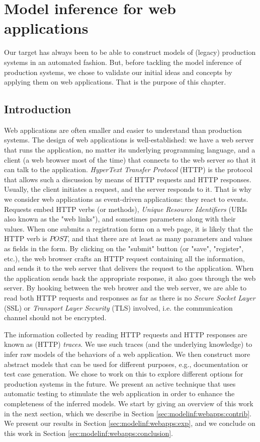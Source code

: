 %
\chapter{Model inference for web applications}
\label{sec:modelinf:webapps}

Our target has always been to be able to construct models of
(legacy) production systems in an automated fashion. But, before
tackling the model inference of production systems, we chose to
validate our initial ideas and concepts by applying them on web
applications. That is the purpose of this chapter.

\section{Introduction}

Web applications are often smaller and easier to understand than
production systems. The design of web applications is
well-established: we have a web server that runs the application,
no matter its underlying programming language, and a client (a
web browser most of the time) that connects to the web server so
that it can talk to the application. \textit{HyperText Transfer
Protocol} (HTTP) is the protocol that allows such a discussion by
means of HTTP requests and HTTP responses. Usually, the client
initiates a request, and the server responds to it. That is why
we consider web applications as event-driven applications: they
react to events. Requests embed HTTP verbs (or methods),
\textit{Unique Resource Identifiers} (URIs also known as the "web
links"), and sometimes parameters along with their values. When
one submits a registration form on a web page, it is likely that
the HTTP verb is $POST$, and that there are at least as many
parameters and values as fields in the form. By clicking on the
"submit" button (or "save", "register", etc.), the web browser
crafts an HTTP request containing all the information, and sends
it to the web server that delivers the request to the
application. When the application sends back the appropriate
response, it also goes through the web server. By hooking between
the web brower and the web server, we are able to read both HTTP
requests and responses as far as there is no \textit{Secure
Socket Layer} (SSL) or \textit{Transport Layer Security} (TLS)
involved, i.e. the communication channel should not be encrypted.

The information collected by reading HTTP requests and HTTP
responses are known as (HTTP) \textit{traces}. We use such traces
(and the underlying knowledge) to infer raw models of the
behaviors of a web application. We then construct more abstract
models that can be used for different purposes, e.g.,
documentation or test case generation. We chose to work on this
to explore different options for production systems in the
future. We present an active technique that uses automatic
testing to stimulate the web application in order to enhance the
completeness of the inferred models.
We start by giving an overview of this work in the next section,
which we describe in Section \ref{sec:modelinf:webapps:contrib}.
We present our results in Section \ref{sec:modelinf:webapps:exp},
and we conclude on this work in Section
\ref{sec:modelinf:webapps:conclusion}.

